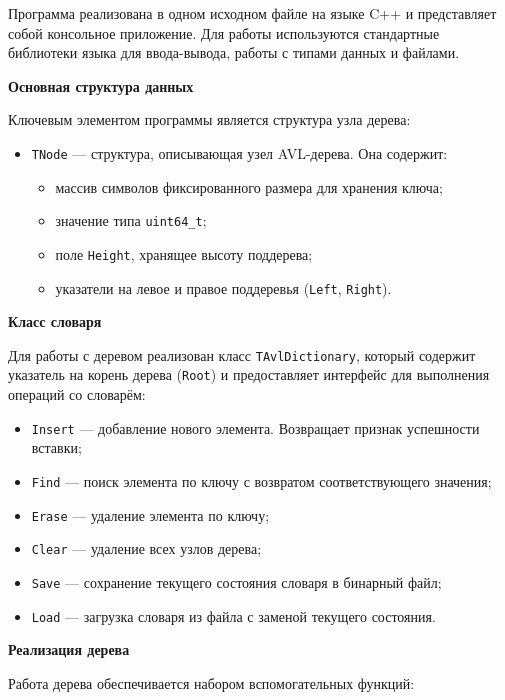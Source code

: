 \documentclass[12pt]{article}
\begin{document}
Программа реализована в одном исходном файле на языке C++ и представляет собой консольное приложение. Для работы используются стандартные библиотеки языка для ввода-вывода, работы с типами данных и файлами.

\vspace{1\baselineskip}
\textbf{Основная структура данных}
\vspace{1\baselineskip}

Ключевым элементом программы является структура узла дерева:

\begin{itemize}
	\item \texttt{TNode} --- структура, описывающая узел AVL-дерева. Она содержит:
	\begin{itemize}
		\item массив символов фиксированного размера для хранения ключа;
		\item значение типа \texttt{uint64\_t};
		\item поле \texttt{Height}, хранящее высоту поддерева;
		\item указатели на левое и правое поддеревья (\texttt{Left}, \texttt{Right}).
	\end{itemize}
\end{itemize}

\textbf{Класс словаря}

Для работы с деревом реализован класс \texttt{TAvlDictionary}, который содержит указатель на корень дерева (\texttt{Root}) и предоставляет интерфейс для выполнения операций со словарём:

\begin{itemize}
	\item \texttt{Insert} --- добавление нового элемента. Возвращает признак успешности вставки;
	\item \texttt{Find} --- поиск элемента по ключу с возвратом соответствующего значения;
	\item \texttt{Erase} --- удаление элемента по ключу;
	\item \texttt{Clear} --- удаление всех узлов дерева;
	\item \texttt{Save} --- сохранение текущего состояния словаря в бинарный файл;
	\item \texttt{Load} --- загрузка словаря из файла с заменой текущего состояния.
\end{itemize}

\textbf{Реализация дерева}

Работа дерева обеспечивается набором вспомогательных функций:
\end{document}
